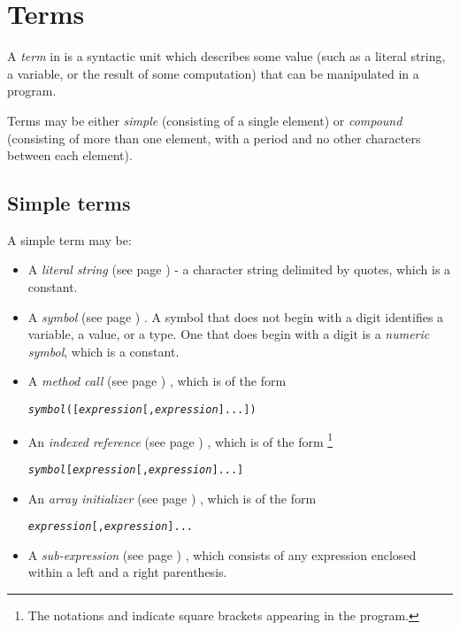 \section{Terms}\label{refterms}
 
A \emph{term} in \nr{} is a syntactic unit which describes some
value (such as a literal string, a variable, or the result of some
computation) that can be manipulated in a \nr{} program.
 
Terms may be either \emph{simple} (consisting of a single element) or
\emph{compound} (consisting of more than one element, with a period
and no other characters between each element).
\subsection{Simple terms}\label{refsimterm}
 A simple term may be:
\begin{itemize}
\item A  \emph{literal string} (see page \pageref{refxstr})  - a character string
delimited by quotes, which is a constant.
\item A  \emph{symbol} (see page \pageref{refsyms}) .
A symbol that does not begin with a digit identifies a variable, a
value, or a type.
One that does begin with a digit is a \emph{numeric symbol}, which is
a constant.
\item A  \emph{method call} (see page \pageref{refmethcon}) , which is of the form
\begin{alltt}
\emph{symbol}([\emph{expression}[,\emph{expression}]...])
\end{alltt}
\item An  \emph{indexed reference} (see page \pageref{refinstr}) , which is of the form
\footnote{
The notations \keyword{'['} and \keyword{']'}
indicate square brackets appearing in the \nr{} program.
}
\begin{alltt}
\emph{symbol}\keyword{'['}[\emph{expression}[,\emph{expression}]...]\keyword{']'}
\end{alltt}
\item An  \emph{array initializer} (see page \pageref{refarrin}) , which is of the form
\begin{alltt}
\keyword{'['}\emph{expression}[,\emph{expression}]...\keyword{']'}
\end{alltt}
\item A  \emph{sub-expression} (see page \pageref{refpreced}) , which consists of any
expression enclosed within a left and a right parenthesis.
\end{itemize}

